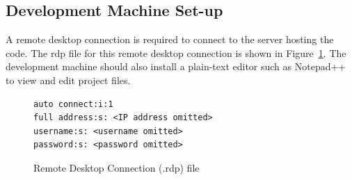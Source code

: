 \subsection{Development Machine Set-up}
A remote desktop connection is required to connect to the server hosting the code. The rdp file for this remote desktop connection is shown in Figure~\ref{alg_rdp}. The development machine should also install a plain-text editor such as Notepad++ to view and edit project files. 
\begin{figure} [tbh]                     
\caption{Remote Desktop Connection (.rdp) file}
\label{alg_rdp}    
\begin{lstlisting}
auto connect:i:1
full address:s: <IP address omitted>
username:s: <username omitted>
password:s: <password omitted>
\end{lstlisting}
\end{figure}


